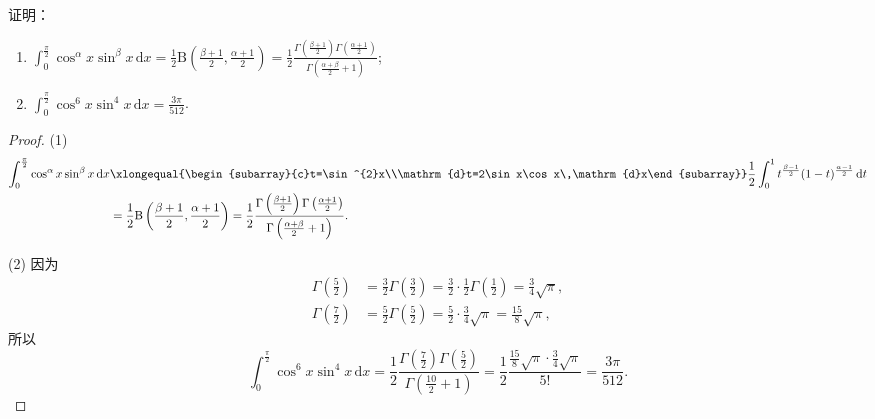 \begin{example}\label{ex:15.4.3}
证明：
\begin{enumerate}
  \item $\displaystyle\int_{0}^{\frac{\pi}{2}}\cos^{\alpha}x\sin^{\beta}x\,\mathrm{d}x=\frac{1}{2}\mathrm{B}\left(\frac{\beta+1}{2},\frac{\alpha+1}{2}\right)=\frac{1}{2}\frac{\Gamma\left(\frac{\beta+1}{2}\right)\Gamma\left(\frac{\alpha+1}{2}\right)}{\Gamma\left(\frac{\alpha+\beta}{2}+1\right)}$;
  \item $\displaystyle\int_{0}^{\frac{\pi}{2}}\cos^{6}x\sin^{4}x\,\mathrm{d}x=\frac{3\pi}{512}$.
\end{enumerate}
\end{example}
\begin{proof}
(1)
\[
  \begin{aligned}
    \int_{0}^{\frac{\pi}{2}}\cos^{\alpha}x\sin^{\beta}x\,\mathrm{d}x&\xlongequal{\begin{subarray}{c}t=\sin^{2}x\\\mathrm{d}t=2\sin x\cos x\,\mathrm{d}x\end{subarray}}\frac{1}{2}\int_{0}^{1}t^{\frac{\beta-1}{2}}(1-t)^{\frac{\alpha-1}{2}}\,\mathrm{d}t\\
    &=\frac{1}{2}\mathrm{B}\left(\frac{\beta+1}{2},\frac{\alpha+1}{2}\right)=\frac{1}{2}\frac{\Gamma\left(\frac{\beta+1}{2}\right)\Gamma\left(\frac{\alpha+1}{2}\right)}{\Gamma\left(\frac{\alpha+\beta}{2}+1\right)}.
  \end{aligned}
\]

(2) 因为
\[
  \begin{aligned}
    \Gamma\left(\frac{5}{2}\right)&=\frac{3}{2}\Gamma\left(\frac{3}{2}\right)=\frac{3}{2}\cdot\frac{1}{2}\Gamma\left(\frac{1}{2}\right)=\frac{3}{4}\sqrt{\pi},\\
    \Gamma\left(\frac{7}{2}\right)&=\frac{5}{2}\Gamma\left(\frac{5}{2}\right)=\frac{5}{2}\cdot\frac{3}{4}\sqrt{\pi}=\frac{15}{8}\sqrt{\pi},
  \end{aligned}
\]
所以
\[
  \int_{0}^{\frac{\pi}{2}}\cos^{6}x\sin^{4}x\,\mathrm{d}x=\frac{1}{2}\frac{\Gamma\left(\frac{7}{2}\right)\Gamma\left(\frac{5}{2}\right)}{\Gamma\left(\frac{10}{2}+1\right)}=\frac{1}{2}\frac{\frac{15}{8}\sqrt{\pi}\cdot\frac{3}{4}\sqrt{\pi}}{5!}=\frac{3\pi}{512}.
\]
\end{proof}

